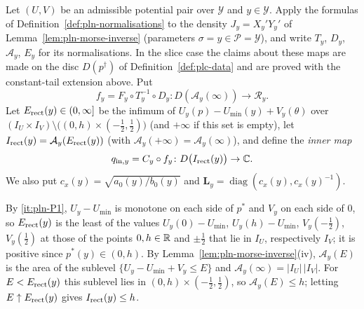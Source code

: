 \begin{definition}\label{def:pln-inner-map}
Let $(U,V)$ be an admissible potential pair over $\mathcal Y$ and $y\in\mathcal Y$. Apply
the formulas of Definition~\ref{def:pln-normalisations} to the density $J_y=X_y'Y_y'$ of Lemma~\ref{lem:pln-morse-inverse}
(parameters $\sigma=y\in\mathcal P=\mathcal Y$), and write $T_y$, $D_y$, $\mathcal A_y$, $E_y$ for its normalisations. In the slice case the claims about these maps are made on the disc $D(p^\dagger)$ of Definition~\ref{def:plc-data}
and are proved with the constant-tail extension above. Put
\[
 f_y=F_y\circ T_y^{-1}\circ D_y\colon D(\mathcal A_y(\infty))\to\mathcal R_y .
\]
Let $E_{\rm rect}(y)\in(0,\infty]$ be the infimum of $U_y(p)-U_{\min}(y)+V_y(\theta)$ over
$(I_U\times I_V)\setminus\bigl((0,h)\times(-\frac12,\frac12)\bigr)$ (and $+\infty$ if this set is empty), let
$I_{\rm rect}(y)=\mathcal A_y(E_{\rm rect}(y))$ (with $\mathcal A_y(+\infty)=\mathcal A_y(\infty)$), and define the
\emph{inner map}
\[
 q_{{\rm in},y}=C_y\circ f_y\colon D\bigl(I_{\rm rect}(y)\bigr)\to\mathbb{C} .
\]
We also put $c_x(y)=\sqrt{a_0(y)/b_0(y)}$ and $\mathbf L_y=\operatorname{diag}(c_x(y),c_x(y)^{-1})$.
\end{definition}

By \ref{it:pln-P1}, $U_y-U_{\min}$ is monotone on each side of $p^*$ and $V_y$ on each side of $0$, so
$E_{\rm rect}(y)$ is the least of the values $U_y(0)-U_{\min}$, $U_y(h)-U_{\min}$, $V_y(-\frac12)$, $V_y(\frac12)$ at those of
the points $0,h\in\mathbb{R}$ and $\pm\frac12$ that lie in $I_U$, respectively $I_V$; it is positive since
$p^*(y)\in(0,h)$. By Lemma~\ref{lem:pln-morse-inverse}(iv), $\mathcal A_y(E)$ is the area of the sublevel
$\{U_y-U_{\min}+V_y\le E\}$ and $\mathcal A_y(\infty)=|I_U|\,|I_V|$. For $E<E_{\rm rect}(y)$ this sublevel lies in
$(0,h)\times(-\frac12,\frac12)$, so $\mathcal A_y(E)\le h$; letting $E\uparrow E_{\rm rect}(y)$ gives $I_{\rm rect}(y)\le h$.

